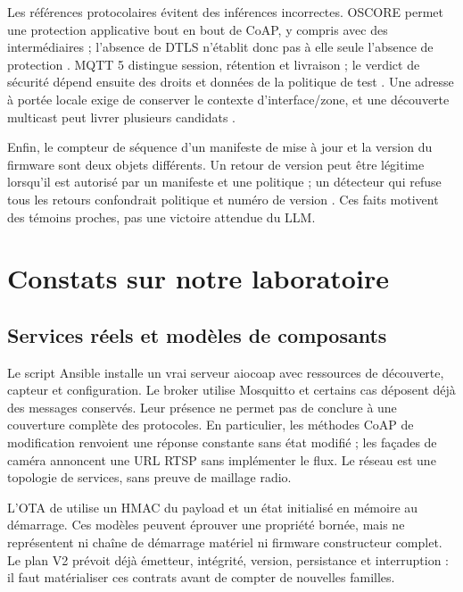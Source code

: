 \documentclass[11pt,a4paper]{article}
\newcommand{\code}[1]{{\small\ttfamily\path{#1}}}
\begin{document}
Les références protocolaires évitent des inférences incorrectes. OSCORE permet une protection applicative bout en bout de CoAP, y compris avec des intermédiaires ; l'absence de DTLS n'établit donc pas à elle seule l'absence de protection \cite{oscore}. MQTT 5 distingue session, rétention et livraison ; le verdict de sécurité dépend ensuite des droits et données de la politique de test \cite{mqtt}. Une adresse à portée locale exige de conserver le contexte d'interface/zone, et une découverte multicast peut livrer plusieurs candidats \cite{mdns,scope6}.

Enfin, le compteur de séquence d'un manifeste de mise à jour et la version du firmware sont deux objets différents. Un retour de version peut être légitime lorsqu'il est autorisé par un manifeste et une politique ; un détecteur qui refuse tous les retours confondrait politique et numéro de version \cite{manifest}. Ces faits motivent des témoins proches, pas une victoire attendue du LLM.

\section{Constats sur notre laboratoire}
\subsection{Services réels et modèles de composants}
Le script Ansible installe un vrai serveur aiocoap avec ressources de découverte, capteur et configuration. Le broker utilise Mosquitto et certains cas déposent déjà des messages conservés. Leur présence ne permet pas de conclure à une couverture complète des protocoles. En particulier, les méthodes CoAP de modification renvoient une réponse constante sans état modifié ; les façades de caméra annoncent une URL RTSP sans implémenter le flux. Le réseau \code{mesh_iot} est une topologie de services, sans preuve de maillage radio.

L'OTA de \code{benchmark_simulator.py} utilise un HMAC du payload et un état initialisé en mémoire au démarrage. Ces modèles peuvent éprouver une propriété bornée, mais ne représentent ni chaîne de démarrage matériel ni firmware constructeur complet. Le plan V2 prévoit déjà émetteur, intégrité, version, persistance et interruption : il faut matérialiser ces contrats avant de compter de nouvelles familles.
\end{document}

